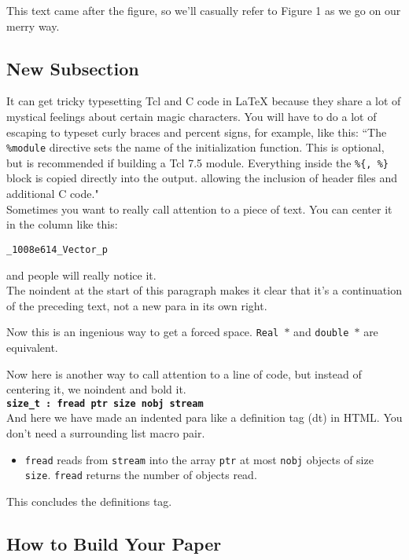 \documentclass[letterpaper,twocolumn,10pt]{article}
\begin{document}
This text came after the figure, so we'll casually refer to Figure 1
as we go on our merry way.

\subsection{New Subsection}

It can get tricky typesetting Tcl and C code in LaTeX because they share
a lot of mystical feelings about certain magic characters.  You
will have to do a lot of escaping to typeset curly braces and percent
signs, for example, like this:
``The {\tt \%module} directive
sets the name of the initialization function.  This is optional, but is
recommended if building a Tcl 7.5 module.
Everything inside the {\tt \%\{, \%\}}
block is copied directly into the output. allowing the inclusion of
header files and additional C code." \\

Sometimes you want to really call attention to a piece of text.  You
can center it in the column like this:
\begin{center}
{\tt \_1008e614\_Vector\_p}
\end{center}
and people will really notice it.\\

\noindent
The noindent at the start of this paragraph makes it clear that it's
a continuation of the preceding text, not a new para in its own right.


Now this is an ingenious way to get a forced space.
{\tt Real~$*$} and {\tt double~$*$} are equivalent. 

Now here is another way to call attention to a line of code, but instead
of centering it, we noindent and bold it.\\

\noindent
{\bf \tt size\_t : fread ptr size nobj stream } \\

And here we have made an indented para like a definition tag (dt)
in HTML.  You don't need a surrounding list macro pair.
\begin{itemize}
\item[]  {\tt fread} reads from {\tt stream} into the array {\tt ptr} at
most {\tt nobj} objects of size {\tt size}.   {\tt fread} returns
the number of objects read. 
\end{itemize}
This concludes the definitions tag.

\subsection{How to Build Your Paper}
\end{document}
